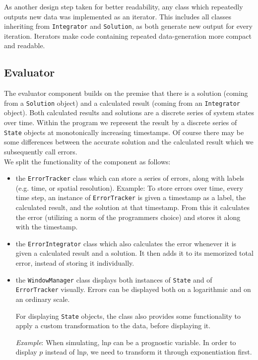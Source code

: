 As another design step taken for better readability, any class which repeatedly outputs new data was implemented as an iterator.
This includes all classes inheriting from \texttt{Integrator} and \texttt{Solution}, as both generate new output for every iteration.
Iterators make code containing repeated data-generation more compact and readable.

\subsection*{Evaluator}
The evaluator component builds on the premise that there is a solution (coming from a \texttt{Solution} object) and a calculated result (coming from an \texttt{Integrator} object).
Both calculated results and solutions are a discrete series of system states over time.
Within the program we represent the result by a discrete series of \texttt{State} objects at monotonically increasing timestamps.
Of course there may be some differences between the accurate solution and the calculated result which we subsequently call errors.
\\

\noindent
We split the functionality of the component as follows:
\begin{itemize}
\item the \texttt{ErrorTracker} class which can store a series of errors, along with labels (e.g. time, or spatial resolution).
Example: To store errors over time, every time step, an instance of \texttt{ErrorTracker} is given a timestamp as a label, the calculated result, and the solution at that timestamp.
From this it calculates the error (utilizing a norm of the programmers choice) and stores it along with the timestamp.
\item the \texttt{ErrorIntegrator} class which also calculates the error whenever it is given a calculated result and a solution.
It then adds it to its memorized total error, instead of storing it individually.
\item the \texttt{WindowManager} class displays both instances of \texttt{State} and of \texttt{ErrorTracker} visually.
Errors can be displayed both on a logarithmic and on an ordinary scale.

For displaying \texttt{State} objects, the class also provides some functionality to apply a custom transformation to the data, before displaying it.

\emph{Example}: When simulating, $\text{ln}p$ can be a prognostic variable.
In order to display $p$ instead of $\text{ln}p$, we need to transform it through exponentiation first.
\end{itemize}

